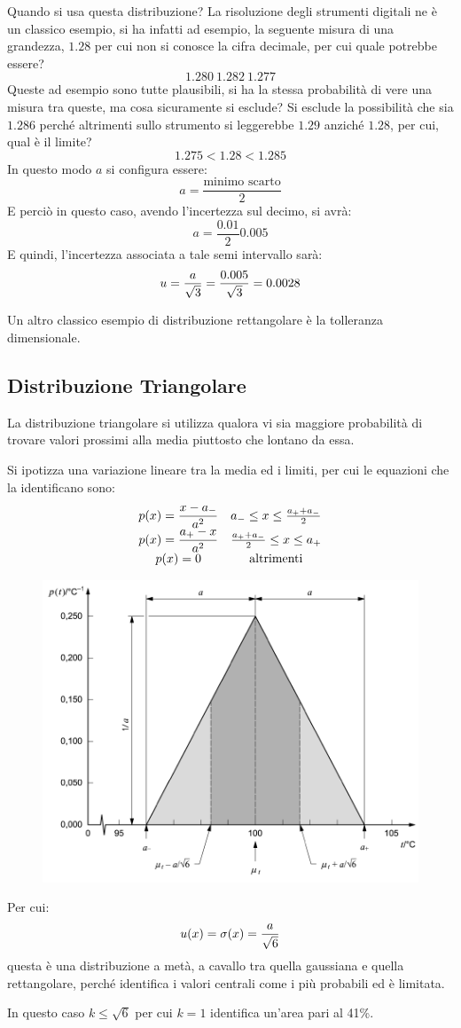 \documentclass[a4paper, 15pt]{article}
\begin{document}
\begin{adjustwidth}{2in}{}
	  Quando si usa questa distribuzione? La risoluzione degli strumenti digitali ne è un classico esempio, si ha infatti ad esempio, la seguente misura di una grandezza, $1.28$ per cui non si conosce la cifra decimale, per cui quale potrebbe essere?
	  \[ 1.280 ~ 1.282 ~ 1.277 \]
	  Queste ad esempio sono tutte plausibili, si ha la stessa probabilità di vere una misura tra queste, ma cosa sicuramente si esclude? Si esclude la possibilità che sia $1.286$ perché altrimenti sullo strumento si leggerebbe $1.29$ anziché $1.28$, per cui, qual è il limite? 
	  \[ 1.275<1.28<1.285\]
	  In questo modo $a$ si configura essere:
	  \[a = \dfrac{\text{minimo scarto}}{2}\]
	  E perciò in questo caso, avendo l'incertezza sul decimo, si avrà:
	  \[a = \dfrac{0.01}{2} 0.005\]
	  E quindi, l'incertezza associata a tale semi intervallo sarà:
	  \[u = {a\over\sqrt{3}}= {0.005\over\sqrt{3}} = 0.0028\]
	  
	  Un altro classico esempio di distribuzione rettangolare è la tolleranza dimensionale.  
\end{adjustwidth}
\newpage
\subsection{Distribuzione Triangolare}
\begin{adjustwidth}{2in}{}	  
	  La distribuzione triangolare si utilizza qualora vi sia maggiore probabilità di
	  trovare valori prossimi alla media piuttosto che lontano da essa.
	  
	  Si ipotizza una variazione lineare tra la media ed i limiti, per cui le equazioni che la identificano sono: 
	  \[\begin{matrix}
	  	p(x) = \dfrac{x-a_-}{a^2} & a_- \leq x \leq {a_+ + a_-\over2} \\
	  	p(x) = \dfrac{a_+-x}{a^2} &  {a_+ + a_-\over2} \leq x \leq a_+ \\
	  	p(x) = 0 & \text{altrimenti}
	  \end{matrix}\]
  		\begin{figure}[H]
  			\centering
  			\includegraphics[width=0.5\linewidth]{fig/screenshot003}
  			\label{fig:screenshot003}
  		\end{figure}
  		Per cui: 
  		\[u(x) = \sigma(x) = {a\over\sqrt{6}}\]
  		 questa è una distribuzione a metà, a cavallo tra quella gaussiana e quella rettangolare, perché identifica i valori centrali come i più probabili ed è limitata. \newline 
  		 
  		 In questo caso $k\leq\sqrt{6}$ per cui $k=1$ identifica un'area pari al 41\%.  
\end{adjustwidth}
\newpage
\end{document}
